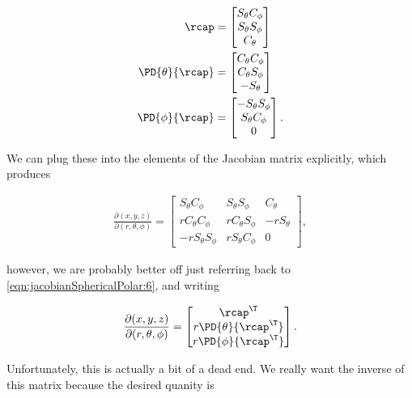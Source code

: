 \begin{subequations}\label{eqn:jacobianSphericalPolar:6}
\begin{align}
\rcap &= 
\begin{bmatrix}
S_\theta C_\phi \\
S_\theta S_\phi \\
C_\theta 
\end{bmatrix} \\
\PD{\theta}{\rcap} &= 
\begin{bmatrix}
C_\theta C_\phi \\
C_\theta S_\phi \\
-S_\theta 
\end{bmatrix} \\
\PD{\phi}{\rcap} &= 
\begin{bmatrix}
-S_\theta S_\phi \\
S_\theta C_\phi \\
0
\end{bmatrix} 
.
\end{align}
\end{subequations}

We can plug these into the elements of the Jacobian matrix explicitly, which produces

\begin{align}\label{eqn:jacobianSphericalPolar:7}
\frac{\partial (x,y,z)}{\partial (r,\theta,\phi)}
=
\begin{bmatrix} 
S_\theta C_\phi & S_\theta S_\phi & C_\theta \\
r C_\theta C_\phi & r C_\theta S_\phi & - r S_\theta \\
-r S_\theta S_\phi & rS_\theta C_\phi & 0
\end{bmatrix},
\end{align}

however, we are probably better off just referring back to \ref{eqn:jacobianSphericalPolar:6}, and writing 

\begin{align}\label{eqn:jacobianSphericalPolar:7a}
\frac{\partial (x,y,z)}{\partial (r,\theta,\phi)}
=
\begin{bmatrix} 
\rcap^\T \\
r \PD{\theta}{\rcap^\T} \\
r \PD{\phi}{\rcap^\T} 
\end{bmatrix}.
\end{align}

Unfortunately, this is actually a bit of a dead end.  We really want the inverse of this matrix because the desired quanity is

